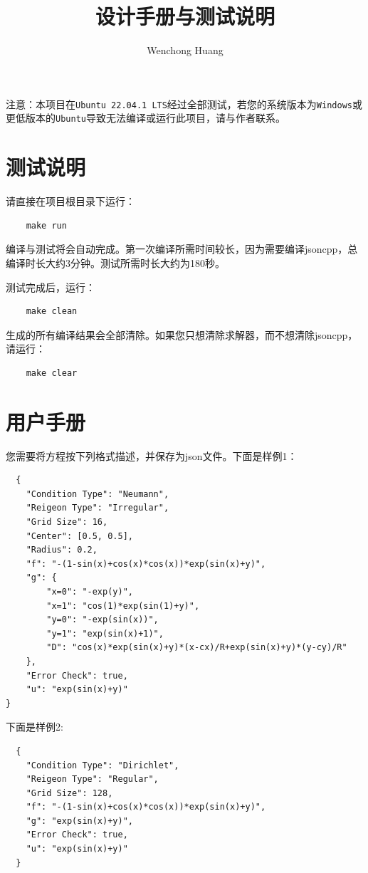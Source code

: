\documentclass[lang=cn,11pt,a4paper]{elegantpaper}
\title{设计手册与测试说明}
\author{Wenchong Huang}
\date{\zhtoday}
\begin{document}
\maketitle

注意：本项目在\verb|Ubuntu 22.04.1 LTS|经过全部测试，若您的系统版本为\verb|Windows|或更低版本的\verb|Ubuntu|导致无法编译或运行此项目，请与作者联系。

\section{测试说明}

请直接在项目根目录下运行：
\begin{lstlisting}
    make run
\end{lstlisting}

编译与测试将会自动完成。第一次编译所需时间较长，因为需要编译jsoncpp，总编译时长大约3分钟。测试所需时长大约为180秒。

测试完成后，运行：
\begin{lstlisting}
    make clean
\end{lstlisting}

生成的所有编译结果会全部清除。如果您只想清除求解器，而不想清除jsoncpp，请运行：
\begin{lstlisting}
    make clear
\end{lstlisting}

\section{用户手册}

您需要将方程按下列格式描述，并保存为json文件。下面是样例1：

\begin{lstlisting}
  {
    "Condition Type": "Neumann",
    "Reigeon Type": "Irregular",
    "Grid Size": 16,
    "Center": [0.5, 0.5],
    "Radius": 0.2,
    "f": "-(1-sin(x)+cos(x)*cos(x))*exp(sin(x)+y)",
    "g": {
        "x=0": "-exp(y)",
        "x=1": "cos(1)*exp(sin(1)+y)",
        "y=0": "-exp(sin(x))",
        "y=1": "exp(sin(x)+1)",
        "D": "cos(x)*exp(sin(x)+y)*(x-cx)/R+exp(sin(x)+y)*(y-cy)/R"
    },
    "Error Check": true,
    "u": "exp(sin(x)+y)"
}
\end{lstlisting}

下面是样例2:
\begin{lstlisting}
  {
    "Condition Type": "Dirichlet",
    "Reigeon Type": "Regular",
    "Grid Size": 128,
    "f": "-(1-sin(x)+cos(x)*cos(x))*exp(sin(x)+y)",
    "g": "exp(sin(x)+y)",
    "Error Check": true,
    "u": "exp(sin(x)+y)"
  }
\end{lstlisting}
\end{document}
